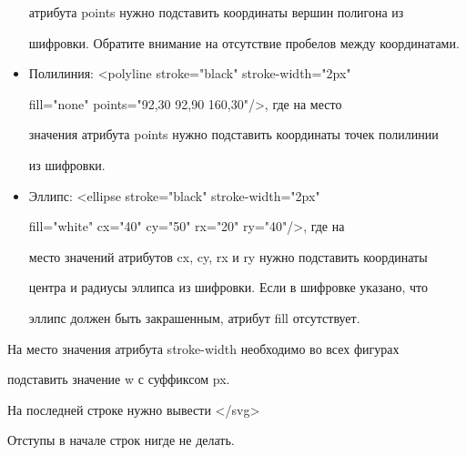 \begin{question}
\begin{itemize}
  атрибута points нужно подставить координаты вершин полигона из

  шифровки. Обратите внимание на отсутствие пробелов между координатами.

\item

  Полилиния: \textless polyline stroke="black" stroke-width="2px"

  fill="none" points="92,30 92,90 160,30"/\textgreater, где на место

  значения атрибута points нужно подставить координаты точек полилинии

  из шифровки.

\item

  Эллипс: \textless ellipse stroke="black" stroke-width="2px"

  fill="white" cx="40" cy="50" rx="20" ry="40"/\textgreater, где на

  место значений атрибутов cx, cy, rx и ry нужно подставить координаты

  центра и радиусы эллипса из шифровки. Если в шифровке указано, что

  эллипс должен быть закрашенным, атрибут fill отсутствует.

\end{itemize}



На место значения атрибута stroke-width необходимо во всех фигурах

подставить значение w с суффиксом px.



На последней строке нужно вывести \textless/svg\textgreater{}



Отступы в начале строк нигде не делать.


\end{question}
